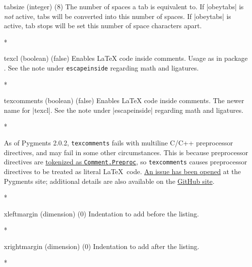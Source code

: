 \begin{paracol}{2}
\begin{optionlist}
  \item[tabsize (integer) (8)]
    The number of spaces a tab is equivalent to.  If |obeytabs| is \emph{not} active, tabs will be converted into this number of spaces.  If |obeytabs| is active, tab stops will be set this number of space characters apart.
    \switchcolumn

\switchcolumn[0]*%
  \item[texcl (boolean) (false)]
    Enables \LaTeX{} code inside comments.
    Usage as in package .  See the note under \texttt{escapeinside} regarding math and ligatures.
    \switchcolumn

\switchcolumn[0]*%
  \item[texcomments (boolean) (false)]
    Enables \LaTeX{} code inside comments.  The newer name for |texcl|.  See the note under |escapeinside| regarding math and ligatures.
    \switchcolumn

\switchcolumn[0]*%

    As of Pygments 2.0.2, \texttt{texcomments} fails with multiline C/C++ preprocessor directives, and may fail in some other circumstances.  This is because preprocessor directives are \href{http://pygments.org/docs/tokens/}{tokenized as \texttt{Comment.Preproc}}, so \texttt{texcomments} causes preprocessor directives to be treated as literal \LaTeX\ code.  \href{https://bitbucket.org/birkenfeld/pygments-main/issue/1086/wrong-processing-of-in-c-c-macros-if-is}{An issue has been opened} at the Pygments site; additional details are also available on the \href{https://github.com/gpoore/minted/issues/66}{ GitHub site}.
    \switchcolumn

\switchcolumn[0]*%
  \item[xleftmargin (dimension) (0)]
    Indentation to add before the listing.
    \switchcolumn

\switchcolumn[0]*%
  \item[xrightmargin (dimension) (0)]
    Indentation to add after the listing.
    \switchcolumn

\switchcolumn[0]*%

\end{optionlist}



\end{paracol}